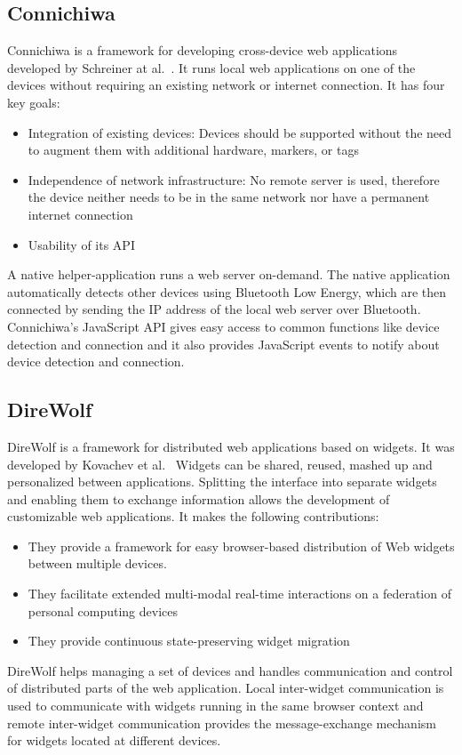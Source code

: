 \subsection{Connichiwa}

Connichiwa is a framework for developing cross-device web applications developed by Schreiner at al.~\cite{connichiwa2015}. It runs local web applications on one of the devices without requiring an existing network or internet connection. It has four key goals:
\begin{itemize}
	\item Integration of existing devices: Devices should be supported without the need to augment them with additional hardware, markers, or tags
	\item Independence of network infrastructure: No remote server is used, therefore the device neither needs to be in the same network nor have a permanent internet connection
	\item Usability of its API
\end{itemize}
A native helper-application runs a web server on-demand. The native application automatically detects other devices using Bluetooth Low Energy, which are then connected by sending the IP address of the local web server over Bluetooth. Connichiwa's JavaScript API gives easy access to common functions like device detection and connection and it also provides JavaScript events to notify about device detection and connection.

\subsection{DireWolf}

DireWolf is a framework for distributed web applications based on widgets. It was developed by Kovachev et al.~\cite{direwolf2013} Widgets can be shared, reused, mashed up and personalized between applications. Splitting the interface into separate widgets and enabling them to exchange information allows the development of customizable web applications. It makes the following contributions:
\begin{itemize}
	\item They provide a framework for easy browser-based distribution of Web widgets between multiple devices.
	\item They facilitate extended multi-modal real-time interactions on a federation of personal computing devices
	\item They provide continuous state-preserving widget migration
\end{itemize}
DireWolf helps managing a set of devices and handles communication and control of distributed parts of the web application. Local inter-widget communication is used to communicate with widgets running in the same browser context and remote inter-widget communication provides the message-exchange mechanism for widgets located at different devices.

